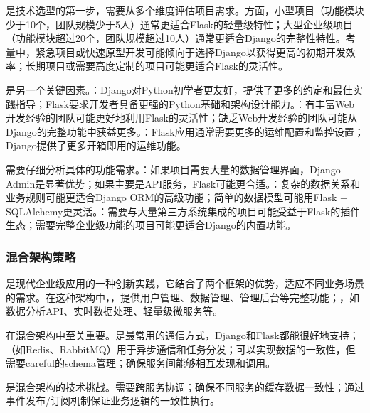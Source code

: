 是技术选型的第一步，需要从多个维度评估项目需求。方面，小型项目（功能模块少于10个，团队规模少于5人）通常更适合Flask的轻量级特性；大型企业级项目（功能模块超过20个，团队规模超过10人）通常更适合Django的完整性特性。考量中，紧急项目或快速原型开发可能倾向于选择Django以获得更高的初期开发效率；长期项目或需要高度定制的项目可能更适合Flask的灵活性。

是另一个关键因素。：Django对Python初学者更友好，提供了更多的约定和最佳实践指导；Flask要求开发者具备更强的Python基础和架构设计能力。：有丰富Web开发经验的团队可能更好地利用Flask的灵活性；缺乏Web开发经验的团队可能从Django的完整功能中获益更多。：Flask应用通常需要更多的运维配置和监控设置；Django提供了更多开箱即用的运维功能。

需要仔细分析具体的功能需求。：如果项目需要大量的数据管理界面，Django Admin是显著优势；如果主要是API服务，Flask可能更合适。：复杂的数据关系和业务规则可能更适合Django ORM的高级功能；简单的数据模型可能用Flask + SQLAlchemy更灵活。：需要与大量第三方系统集成的项目可能受益于Flask的插件生态；需要完整企业级功能的项目可能更适合Django的内置功能。

\hypertarget{ux6df7ux5408ux67b6ux6784ux7b56ux7565}{%
\subsubsection{混合架构策略}\label{ux6df7ux5408ux67b6ux6784ux7b56ux7565}}

是现代企业级应用的一种创新实践，它结合了两个框架的优势，适应不同业务场景的需求。在这种架构中，，提供用户管理、数据管理、管理后台等完整功能；，如数据分析API、实时数据处理、轻量级微服务等。

在混合架构中至关重要。是最常用的通信方式，Django和Flask都能很好地支持；（如Redis、RabbitMQ）用于异步通信和任务分发；可以实现数据的一致性，但需要careful的schema管理；确保服务间能够相互发现和调用。

是混合架构的技术挑战。需要跨服务协调；确保不同服务的缓存数据一致性；通过事件发布/订阅机制保证业务逻辑的一致性执行。

